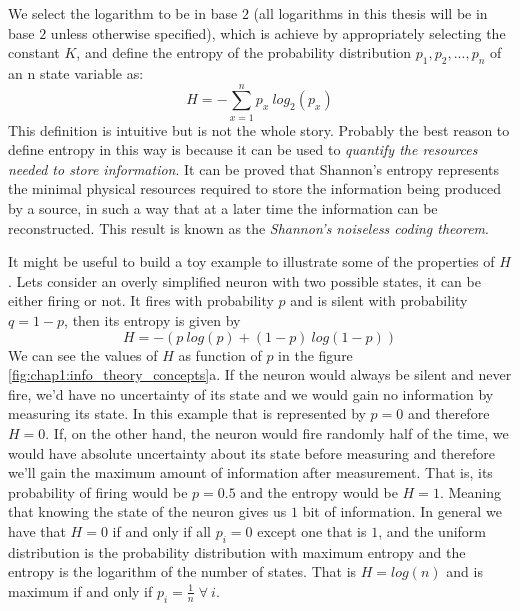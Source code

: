 We select the logarithm to be in base $2$ (all logarithms in this thesis will be in base $2$ unless otherwise specified), which is achieve by appropriately selecting the constant $K$, and define the entropy of the probability distribution $p_1,p_2,...,p_n$ of an n state variable as:
\begin{equation}
    H=- \sum_{x=1}^n p_x\ log_2 (p_x)
\end{equation}
This definition is intuitive but is not the whole story. Probably the best reason to define entropy in this way is because it can be used to \textit{quantify the resources needed to store information}. 
It can be proved that Shannon's entropy represents the minimal physical resources required to store the information being produced by a source, in such a way that at a later time the information can be reconstructed.
This result is known as the \textit{Shannon’s noiseless coding theorem}.

It might be useful to build a toy example to illustrate some of the properties of $H$. Lets consider an overly simplified neuron with two possible states, it can be either firing or not. It fires with probability $p$ and is silent with probability $q=1-p$, then its entropy is given by
\begin{equation}
    H=-(p\ log (p) + (1-p)\ log (1-p))
\end{equation}
We can see the values of $H$ as function of $p$ in the figure \ref{fig:chap1:info_theory_concepts}a.
If the neuron would always be silent and never fire, we'd have no uncertainty of its state and we would gain no information by measuring its state.
In this example that is represented by $p=0$ and therefore $H=0$.
If, on the other hand, the neuron would fire randomly half of the time, we would have absolute uncertainty about its state before measuring and therefore we'll gain the maximum amount of information after measurement.
That is, its probability of firing would be $p=0.5$ and the entropy would be $H=1$.
Meaning that knowing the state of the neuron gives us $1$ bit of information.
In general we have that $H=0$ if and only if all $p_i=0$ except one that is $1$, and the uniform distribution is the probability distribution with maximum entropy and the entropy is the logarithm of the number of states.
That is $H=log(n)$ and is maximum if and only if $p_i=\frac{1}{n} \; \forall \ i$.

